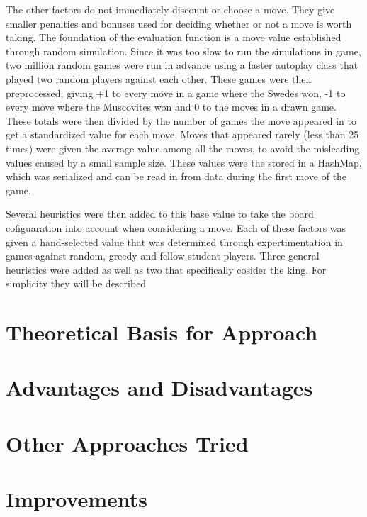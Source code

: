 \documentclass[11 pt, letter paper]{article}
\begin{document}
        The other factors do not immediately discount or choose a move.
        They give smaller penalties and bonuses used for deciding whether or not a move is worth taking.
        The foundation of the evaluation function is a move value established through random simulation.
        Since it was too slow to run the simulations in game, two million random games were run in advance
        using a faster autoplay class that played two random players against each other.
        These games were then preprocessed, giving +1 to every move in a game where the Swedes won, -1 to every move where the Muscovites won
        and 0 to the moves in a drawn game. These totals were then divided by the number of games the move appeared in to get a standardized value for each move.
        Moves that appeared rarely (less than 25 times) were given the average value among all the moves, to avoid the misleading values caused by a small sample size.
        These values were the stored in a HashMap, which was serialized and can be read in from data during the first move of the game.

        Several heuristics were then added to this base value to take the board cofiguaration into account when considering a move.
        Each of these factors was given a hand-selected value that was determined through expertimentation in games against random, greedy and fellow student players.
        Three general heuristics were added as well as two that specifically cosider the king. For simplicity they will be described

    \section{Theoretical Basis for Approach}

    \section{Advantages and Disadvantages}

    \section{Other Approaches Tried}

    \section{Improvements}
\end{document}
